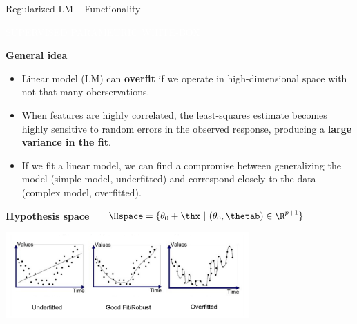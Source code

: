 \documentclass[11pt,compress,t,notes=noshow, xcolor=table]{beamer}
\newcommand{\maketag}[1]{\colorbox{highlightcol}{\textcolor{white}
{\MakeUppercase{#1}}}}
\newcommand{\highlight}[1]{\textcolor{highlightcol}{\textbf{#1}}}
\begin{document}
\begin{frame}{Regularized LM -- Functionality}

\footnotesize

\maketag{SUPERVISED}
\maketag{PARAMETRIC}
\maketag{WHITE-BOX}

\medskip

\highlight{General idea} ~~
\begin{itemize}

\item Linear model (LM) can \textbf{overfit} if we operate in high-dimensional space with not that many oberservations.

\item When features are highly correlated, the least-squares estimate becomes highly sensitive to random errors in the observed response, producing a \textbf{large variance in the fit}.

\item If we fit a linear model, we can find a compromise between generalizing the model (simple model, underfitted) and correspond closely to the data (complex model, overfitted).

\end{itemize}

\medskip

\highlight{Hypothesis space} ~~
$\Hspace = \{ \theta_0 + \thx\ |\ (\theta_0, \thetab) \in \R^{p+1} \} $

\medskip
\centering
  \includegraphics[width=0.7\textwidth]{figure/reg_lm_comparision.png}

\end{frame}

\end{document}
